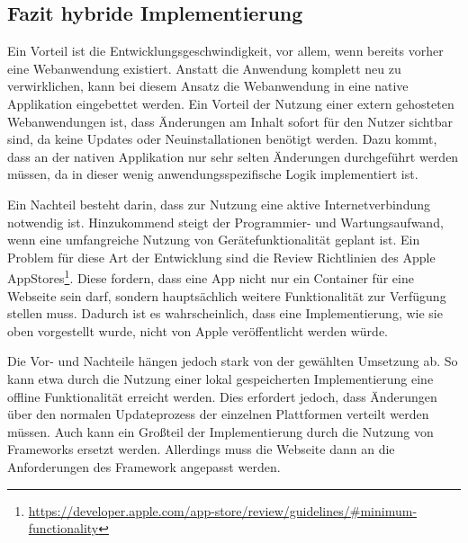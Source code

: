 \subsection{Fazit hybride Implementierung}
Ein Vorteil ist die Entwicklungsgeschwindigkeit, vor allem, wenn bereits vorher eine Webanwendung existiert. Anstatt die Anwendung komplett neu zu verwirklichen, kann bei diesem Ansatz die Webanwendung in eine native Applikation eingebettet werden.
Ein Vorteil der Nutzung einer extern gehosteten Webanwendungen ist, dass Änderungen am Inhalt sofort für den Nutzer sichtbar sind, da keine Updates oder Neuinstallationen benötigt werden. 
Dazu kommt, dass an der nativen Applikation nur sehr selten Änderungen durchgeführt werden müssen, da in dieser wenig anwendungsspezifische Logik implementiert ist.

Ein Nachteil besteht darin, dass zur Nutzung eine aktive Internetverbindung notwendig ist. Hinzukommend steigt der Programmier- und Wartungsaufwand, wenn eine umfangreiche Nutzung von Gerätefunktionalität geplant ist. 
Ein Problem für diese Art der Entwicklung sind die Review Richtlinien des Apple AppStores\footnote{\url{https://developer.apple.com/app-store/review/guidelines/\#minimum-functionality}}. 
Diese fordern, dass eine App nicht nur ein Container für eine Webseite sein darf, sondern hauptsächlich weitere Funktionalität zur Verfügung stellen muss. Dadurch ist es wahrscheinlich, dass eine Implementierung, wie sie oben vorgestellt wurde, nicht von Apple veröffentlicht werden würde.

Die Vor- und Nachteile hängen jedoch stark von der gewählten Umsetzung ab. So kann etwa durch die Nutzung einer lokal gespeicherten Implementierung eine offline Funktionalität erreicht werden. Dies erfordert jedoch, dass Änderungen über den normalen Updateprozess der einzelnen Plattformen verteilt werden müssen.
Auch kann ein Großteil der Implementierung durch die Nutzung von Frameworks ersetzt werden. Allerdings muss die Webseite dann an die Anforderungen des Framework angepasst werden. 
